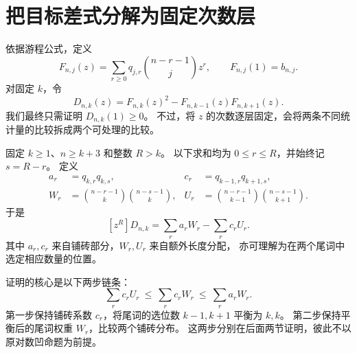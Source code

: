\documentclass[UTF8,a4paper,11pt,fontset=none]{ctexart}
\numberwithin{equation}{section}
\theoremstyle{paperplain}
\theoremstyle{definition}
\theoremstyle{remark}
\begin{document}
\section{把目标差式分解为固定次数层}\label{sec:reduction}
依据游程公式，定义
\begin{equation}\label{eq:F}
F_{n,j}(z)=\sum_{r\ge0}q_{j,r}\binom{n-r-1}{j}z^r,\qquad
F_{n,j}(1)=b_{n,j}.
\end{equation}
对固定 $k$，令
\begin{equation}\label{eq:D}
D_{n,k}(z)=F_{n,k}(z)^2-F_{n,k-1}(z)F_{n,k+1}(z).
\end{equation}
我们最终只需证明 $D_{n,k}(1)\ge0$。
不过，将 $z$ 的次数逐层固定，会将两条不同统计量的比较拆成两个可处理的比较。

固定 $k\ge1$、$n\ge k+3$ 和整数 $R>k$。
以下求和均为 $0\le r\le R$，并始终记 $s=R-r$。
定义
\begin{align}
a_r&=q_{k,r}q_{k,s},&
c_r&=q_{k-1,r}q_{k+1,s},\label{eq:ac}\\
W_r&=\binom{n-r-1}{k}\binom{n-s-1}{k},&
U_r&=\binom{n-r-1}{k-1}\binom{n-s-1}{k+1}.\label{eq:WU}
\end{align}
于是
\begin{equation}\label{eq:layer}
[z^R]D_{n,k}=\sum_r a_rW_r-\sum_r c_rU_r.
\end{equation}
其中 $a_r,c_r$ 来自铺砖部分，$W_r,U_r$ 来自额外长度分配，
亦可理解为在两个尾词中选定相应数量的位置。

证明的核心是以下两步链条：
\begin{equation}\label{eq:chain}
\sum_r c_rU_r
\ \le\ \sum_r c_rW_r
\ \le\ \sum_r a_rW_r.
\end{equation}
第一步保持铺砖系数 $c_r$，将尾词的选位数 $k-1,k+1$ 平衡为 $k,k$。
第二步保持平衡后的尾词权重 $W_r$，比较两个铺砖分布。
这两步分别在后面两节证明，彼此不以原对数凹命题为前提。
\end{document}
